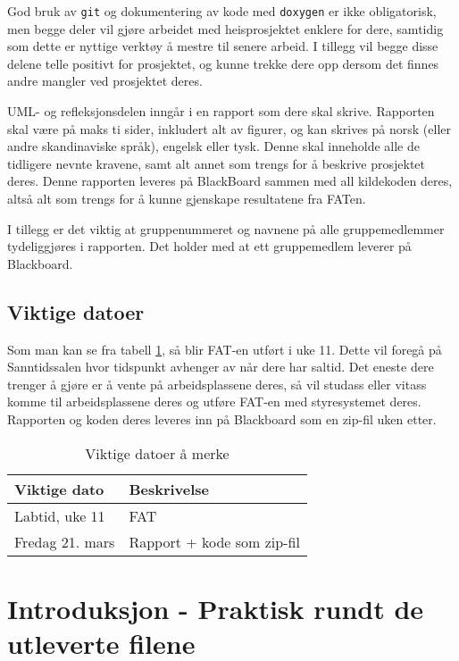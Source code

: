 \begin{alphasection}
God bruk av \verb|git| og dokumentering av kode med \verb|doxygen| er ikke obligatorisk, men begge deler vil gjøre arbeidet med heisprosjektet enklere for dere, samtidig som dette er nyttige verktøy å mestre til senere arbeid. I tillegg vil begge disse delene telle positivt for prosjektet, og kunne trekke dere opp dersom det finnes andre mangler ved prosjektet deres.

UML- og refleksjonsdelen inngår i en rapport som dere skal skrive. Rapporten skal være på maks ti sider, inkludert alt av figurer, og kan skrives på norsk (eller andre skandinaviske språk), engelsk eller tysk. Denne skal inneholde alle de tidligere nevnte kravene, samt alt annet som trengs for å beskrive prosjektet deres. Denne rapporten leveres på BlackBoard sammen med all kildekoden deres, altså alt som trengs for å kunne gjenskape resultatene fra FATen.

I tillegg er det viktig at gruppenummeret og navnene på alle gruppemedlemmer tydeliggjøres i rapporten. Det holder med at ett gruppemedlem leverer på Blackboard.

\subsection*{Viktige datoer}
Som man kan se fra tabell \ref{tab:viktige-dato}, så blir FAT-en utført i uke 11. Dette vil foregå på Sanntidssalen hvor tidspunkt avhenger av når dere har saltid. Det eneste dere trenger å gjøre er å vente på arbeidsplassene deres, så vil studass eller vitass komme til arbeidsplassene deres og utføre FAT-en med styresystemet deres. Rapporten og koden deres leveres inn på Blackboard som en zip-fil uken etter.

\begin{table}[ht]
\centering
 \begin{tabular}{|p{4cm} p{5.5cm}|} 
 \hline
 Viktige dato & Beskrivelse \\ [0.5ex] 
 \hline\hline
  Labtid, uke 11 & FAT \\
 \hline
  Fredag 21. mars & Rapport + kode som zip-fil \\
 \hline
\end{tabular}
\caption{Viktige datoer å merke}
\label{tab:viktige-dato} 
\end{table}

\section{Introduksjon - Praktisk rundt de utleverte filene}


\end{alphasection}
